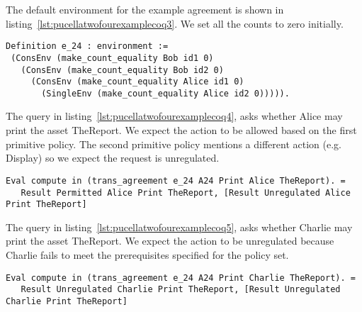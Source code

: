 The default environment for the example agreement is shown in listing~\ref{lst:pucellatwofourexamplecoq3}. We set all the counts to zero initially.

\begin{minipage}[c]{0.95\textwidth}
\begin{lstlisting}
Definition e_24 : environment :=
 (ConsEnv (make_count_equality Bob id1 0)
   (ConsEnv (make_count_equality Bob id2 0)
     (ConsEnv (make_count_equality Alice id1 0)
       (SingleEnv (make_count_equality Alice id2 0))))).
\end{lstlisting}
\end{minipage} 

The query in listing~\ref{lst:pucellatwofourexamplecoq4}, asks whether Alice may print the asset TheReport. We expect the action to be allowed based on the first primitive policy. The second primitive policy mentions a different action (e.g. Display) so we expect the request is unregulated. 

\begin{minipage}[c]{0.95\textwidth}
\begin{lstlisting}
Eval compute in (trans_agreement e_24 A24 Print Alice TheReport). = 
   Result Permitted Alice Print TheReport, [Result Unregulated Alice Print TheReport]
\end{lstlisting}
\end{minipage} 

The query in listing~\ref{lst:pucellatwofourexamplecoq5}, asks whether Charlie may print the asset TheReport. We expect the action to be unregulated because Charlie fails to meet the prerequisites specified for the policy set. 

\begin{minipage}[c]{0.95\textwidth}
\begin{lstlisting}
Eval compute in (trans_agreement e_24 A24 Print Charlie TheReport). = 
   Result Unregulated Charlie Print TheReport, [Result Unregulated Charlie Print TheReport]
\end{lstlisting}
\end{minipage} 

